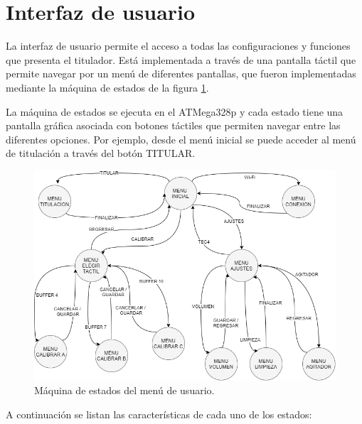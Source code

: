 \section{Interfaz de usuario}

La interfaz de usuario permite el acceso a todas las configuraciones y funciones que presenta el titulador. Está implementada a través de una pantalla táctil que permite navegar por un menú de diferentes pantallas, que fueron implementadas mediante la máquina de estados de la figura \ref{fig:MEFmenu}.

La máquina de estados se ejecuta en el ATMega328p y cada estado tiene una pantalla gráfica asociada con botones táctiles que permiten navegar entre las diferentes opciones. Por ejemplo, desde el menú inicial se puede acceder al menú de titulación a través del botón TITULAR.

\begin{figure}[htbp]
	\centering
	\includegraphics[width=1.0\textwidth]{./Figures/MEFmenu.png}
	\caption{Máquina de estados del menú de usuario.}
	\label{fig:MEFmenu}
\end{figure}

A continuación se listan las características de cada uno de los estados:

